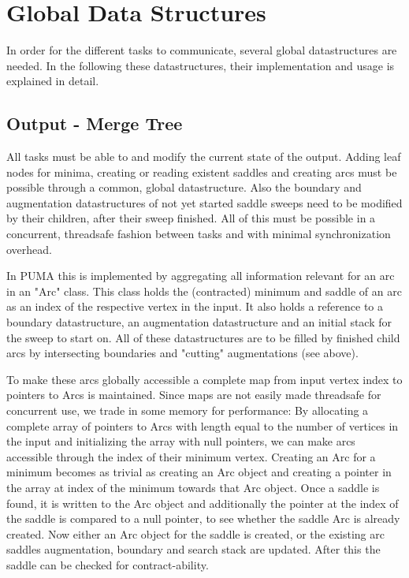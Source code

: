 \documentclass[%
	paper=A4,					%
	twoside=true,				%
	openright,					%
	parskip=full,				%
	chapterprefix=true,			%
	11pt,						%
	headings=normal,			%
	bibliography=totoc,			%
	listof=totoc,				%
	titlepage=on,				%
	captions=tableabove,		%
	draft=false,				%
]{scrreprt}%
\begin{document}
\section{Global Data Structures}
In order for the different tasks to communicate, several global datastructures are needed. In the following these datastructures, their implementation and usage is explained in detail.

\subsection{Output - Merge Tree}
All tasks must be able to  and modify the current state of the output. Adding leaf nodes for minima, creating or reading existent saddles and creating arcs must be possible through a common, global datastructure. Also the boundary and augmentation datastructures of not yet started saddle sweeps need to be modified by their children, after their sweep finished. All of this must be possible in a concurrent, threadsafe fashion between tasks and with minimal synchronization overhead.

In PUMA this is implemented by aggregating all information relevant for an arc in an "Arc" class. This class holds the (contracted) minimum and saddle of an arc as an index of the respective vertex in the input. It also holds a reference to a boundary datastructure, an augmentation datastructure and an initial stack for the sweep to start on. All of these datastructures are to be filled by finished child arcs by intersecting boundaries and "cutting" augmentations (see above).

To make these arcs globally accessible a complete map from input vertex index to pointers to Arcs is maintained. Since maps are not easily made threadsafe for concurrent use, we trade in some memory for performance: By allocating a complete array of pointers to Arcs with length equal to the number of vertices in the input and initializing the array with null pointers, we can make arcs accessible through the index of their minimum vertex. Creating an Arc for a minimum becomes as trivial as creating an Arc object and creating a pointer in the array at index of the minimum towards that Arc object. Once a saddle is found, it is written to the Arc object and additionally the pointer at the index of the saddle is compared to a null pointer, to see whether the saddle Arc is already created. Now either an Arc object for the saddle is created, or the existing arc saddles augmentation, boundary and search stack are updated. After this the saddle can be checked for contract-ability.
\end{document}
